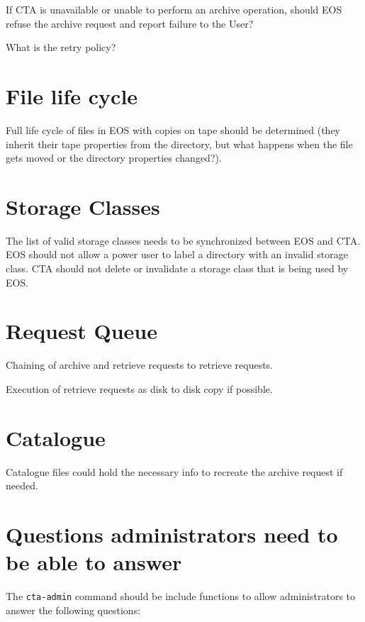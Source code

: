 If CTA is unavailable or unable to perform an archive operation, should EOS refuse the archive request and report failure
to the User?

What is the retry policy?

\section{File life cycle}

Full life cycle of files in EOS with copies on tape should be determined (they inherit their tape properties
from the directory, but what happens when the file gets moved or the directory properties changed?).

\section{Storage Classes}

The list of valid storage classes needs to be synchronized between EOS and CTA. EOS should not allow a power user to
label a directory with an invalid storage class. CTA should not delete or invalidate a storage class that is being used
by EOS.

\section{Request Queue}

Chaining of archive and retrieve requests to retrieve requests.

Execution of retrieve requests as disk to disk copy if possible.


\section{Catalogue}

Catalogue files could hold the necessary info to recreate the archive request if needed.

\section{Questions administrators need to be able to answer}

The \texttt{cta-admin} command should be include functions to allow administrators to answer the following questions:

